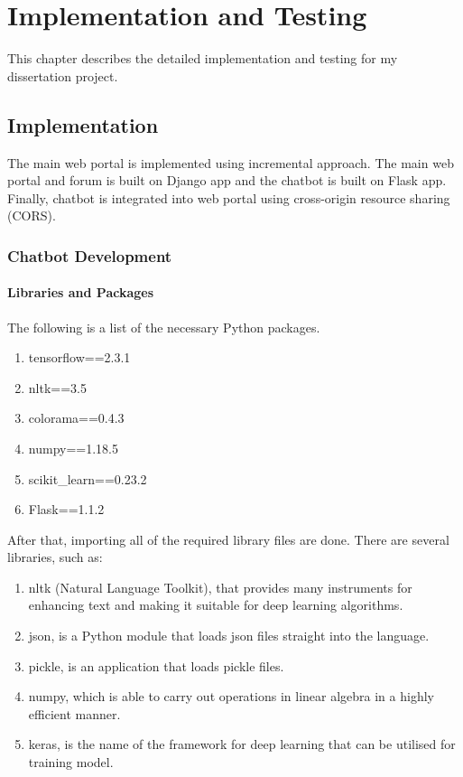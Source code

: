\def\baselinestretch{1}

\chapter{Implementation and Testing}
This chapter describes the detailed implementation and testing for my dissertation project.

\section{Implementation}
The main web portal is implemented using incremental approach. The main web portal and forum is built on Django app and the chatbot is built on Flask app. Finally, chatbot is integrated into web portal using cross-origin  resource sharing (CORS).

\subsection{Chatbot Development}

\subsubsection{Libraries and Packages}
The following is a list of the necessary Python packages.
\begin{enumerate}[label=\arabic*.]
	\item tensorflow==2.3.1
	\item nltk==3.5
	\item colorama==0.4.3
	\item numpy==1.18.5
	\item scikit\_learn==0.23.2
	\item Flask==1.1.2
\end{enumerate}

After that, importing all of the required library files are done. There are several libraries, such as:
\begin{enumerate}[label=$\ast$]
	\item nltk (Natural Language Toolkit), that provides many instruments for enhancing text and making it suitable for deep learning algorithms.
	\item json, is a Python module that loads json files straight into the language.
	\item pickle, is an application that loads pickle files.
	\item numpy, which is able to carry out operations in linear algebra in a highly efficient manner.
	\item keras, is the name of the framework for deep learning that can be utilised for training model.
\end{enumerate} 

